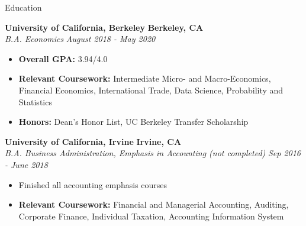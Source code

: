 \documentclass{resume} %
\begin{document}

\begin{rSection}{Education}

{\bf University of California, Berkeley} \hfill {\bf {Berkeley, CA}} %
\\ {\it B.A. Economics} \hfill {\em August 2018 - May 2020} %
\begin{itemize}
    \item {\bf Overall GPA:} 3.94/4.0 
    \item {\bf Relevant Coursework:} Intermediate Micro- and Macro-Economics, Financial Economics, International Trade, Data Science, Probability and Statistics
    \item {\bf Honors:} Dean’s Honor List, UC Berkeley Transfer Scholarship
\end{itemize}

{\bf University of California, Irvine} \hfill {\bf {Irvine, CA}} %
\\{\it B.A. Business Administration, Emphasis in Accounting (not completed)} \hfill {\em Sep 2016 - June 2018} %
\begin{itemize}
    \item Finished all accounting emphasis courses
    \item {\bf Relevant Coursework:} Financial and Managerial Accounting, Auditing, Corporate Finance, Individual Taxation, Accounting Information System
\end{itemize}

\end{rSection}


\end{document}
